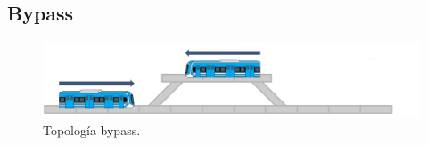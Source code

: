 \subsection{Bypass}

\lipsum[1]

    \begin{figure}[h]
        \centering
        \includegraphics[width=1\textwidth]{Figuras/bypass}
        \centering\caption{Topología bypass.}
        \label{fig:bypass_1}
    \end{figure}
    
\lipsum[1]